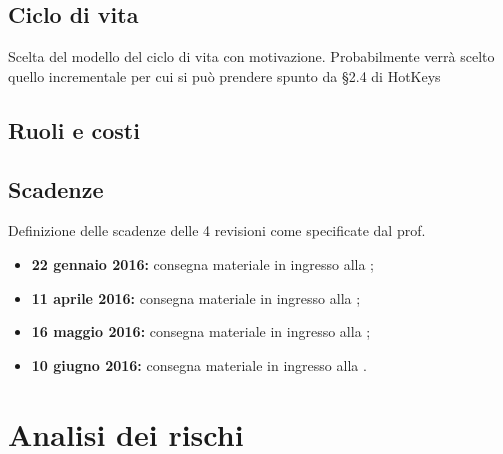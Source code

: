 \documentclass[12pt,a4paper]{article}
\begin{document}
\subsection{Ciclo di vita}
Scelta del modello del ciclo di vita con motivazione. Probabilmente verrà scelto quello incrementale per cui si può prendere spunto da §2.4 di HotKeys

\subsection{Ruoli e costi}

\subsection{Scadenze}
Definizione delle scadenze delle 4 revisioni come specificate dal prof.

\begin{itemize}
	\item \textbf{22 gennaio 2016:} consegna materiale in ingresso alla \RR;
	\item \textbf{11 aprile 2016:} consegna materiale in ingresso alla  \RP;
	\item \textbf{16 maggio 2016:} consegna materiale in ingresso alla \RQ;
	\item \textbf{10 giugno 2016:} consegna materiale in ingresso alla \RA.
\end{itemize}

\newpage

\section{Analisi dei rischi}
\end{document}
